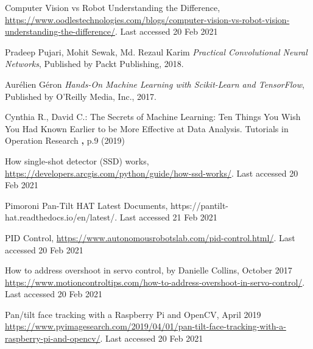 \documentclass[runningheads]{llncs}
\begin{document}
%
%
%
% 
% 
%

\begin{thebibliography}{8}


Computer Vision vs Robot Understanding the Difference, \url{https://www.oodlestechnologies.com/blogs/computer-vision-vs-robot-vision-understanding-the-difference/}. 
Last accessed 20 Feb 2021


Pradeep Pujari, Mohit Sewak, Md. Rezaul Karim
{\it Practical Convolutional Neural Networks},
Published by Packt Publishing,
2018.


Aurélien Géron
{\it Hands-On Machine Learning with Scikit-Learn and TensorFlow},
Published by  O'Reilly Media, Inc.,
2017.


Cynthia R., David C.: The Secrets of Machine Learning: Ten Things
You Wish You Had Known Earlier to be More Effective at Data Analysis. Tutorials in Operation Research \textbf, p.9 (2019)


How single-shot detector (SSD) works,
\url{https://developers.arcgis.com/python/guide/how-ssd-works/}. 
Last accessed 20 Feb 2021


Pimoroni Pan-Tilt HAT Latest Documents,
https://pantilt-hat.readthedocs.io/en/latest/. 
Last accessed 21 Feb 2021

PID Control,
\url{https://www.autonomousrobotslab.com/pid-control.html/}. 
Last accessed 20 Feb 2021

How to address overshoot in servo control, by Danielle Collins, October 2017
\url{https://www.motioncontroltips.com/how-to-address-overshoot-in-servo-control/}. 
Last accessed 20 Feb 2021


Pan/tilt face tracking with a Raspberry Pi and OpenCV, April 2019
\url{https://www.pyimagesearch.com/2019/04/01/pan-tilt-face-tracking-with-a-raspberry-pi-and-opencv/}. 
Last accessed 20 Feb 2021

\end{thebibliography}
\end{document}
